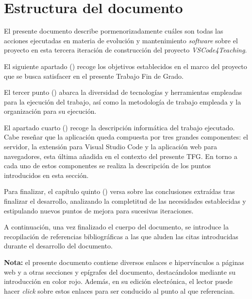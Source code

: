 \section{Estructura del documento}
El presente documento describe pormenorizadamente cuáles son todas las acciones ejecutadas en materia de evolución y mantenimiento \textit{software} sobre el proyecto en esta tercera iteración de construcción del proyecto \textit{VSCode4Teaching}.

El siguiente apartado () recoge los objetivos establecidos en el marco del proyecto que se busca satisfacer en el presente Trabajo Fin de Grado.

El tercer punto () abarca la diversidad de tecnologías y herramientas empleadas para la ejecución del trabajo, así como la metodología de trabajo empleada y la organización para su ejecución.

El apartado cuarto () recoge la descripción informática del trabajo ejecutado. Cabe reseñar que la aplicación queda compuesta por tres grandes componentes: el servidor, la extensión para Visual Studio Code y la aplicación web para navegadores, esta última añadida en el contexto del presente TFG. En torno a cada uno de estos componentes se realiza la descripción de los puntos introducidos en esta sección.

Para finalizar, el capítulo quinto () versa sobre las conclusiones extraídas tras finalizar el desarrollo, analizando la completitud de las necesidades establecidas y estipulando nuevos puntos de mejora para sucesivas iteraciones.

A continuación, una vez finalizado el cuerpo del documento, se introduce la recopilación de referencias bibliográficas a las que aluden las citas introducidas durante el desarrollo del documento.

\noindent\textbf{Nota:} el presente documento contiene diversos enlaces e hipervínculos a páginas web y a otras secciones y epígrafes del documento, destacándolos mediante su introducción en {\color{RedLink}color rojo}. Además, en su edición electrónica, el lector puede hacer \textit{click} sobre estos enlaces para ser conducido al punto al que referencian.
